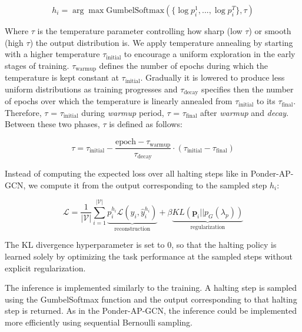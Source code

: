 \documentclass{gdl}
\begin{document}
\begin{equation}
    h_i = \arg\max \text{GumbelSoftmax}(\{\log p_i^1,...,\log p_i^{T}\}, \tau)
\end{equation}

\noindent Where $\tau$ is the temperature parameter controlling how sharp (low $\tau$) or smooth (high $\tau$) the output distribution is. We apply temperature annealing by starting with a higher temperature $\tau_{\text{initial}}$ to encourage a uniform exploration in the early stages of training. $\tau_{\text{warmup}}$ defines the number of epochs during which the temperature is kept constant at $\tau_{\text{initial}}$. Gradually it is lowered to produce less uniform distributions as training progresses and $\tau_{\text{decay}}$ specifies then the number of epochs over which the temperature is linearly annealed from $\tau_{\text{initial}}$ to its $\tau_{\text{final}}$.
Therefore, $\tau$ = $\tau_{\text{initial}}$ during \textit{warmup} period, $\tau$ = $\tau_{\text{final}}$ after \textit{warmup} and \textit{decay}. Between these two phases, $\tau$ is defined as follows:

\begin{equation}
\tau = \tau_{\text{initial}} - \frac{\text{epoch} - \tau_{\text{warmup}}}{\tau_{\text{decay}}}  \cdot (\tau_{\text{initial}} - \tau_{\text{final}})
\end{equation}

Instead of computing the expected loss over all halting steps like in Ponder-AP-GCN, we compute it from the output corresponding to the sampled step $h_i$:

\begin{equation}
\mathcal{L} = \frac{1}{|\mathcal{V}|} \sum_{i=1}^{\mathcal{|V|}} \underbrace{p_i^{h_i} \mathcal{L}(y_i, \hat{y}_i^{h_i})}_{\text{reconstruction}} + \beta \underbrace{KL(\mathbf{p}_i || p_G(\lambda_p))}_{\text{regularization}}
\end{equation}

\noindent The KL divergence hyperparameter is set to 0, so that the halting policy is learned solely by optimizing the task performance at the sampled steps without explicit regularization. 

The inference is implemented similarly to the training. A halting step is sampled using the GumbelSoftmax function and the output corresponding to that halting step is returned. As in the Ponder-AP-GCN, the inference could be implemented more efficiently using sequential Bernoulli sampling.
\end{document}
